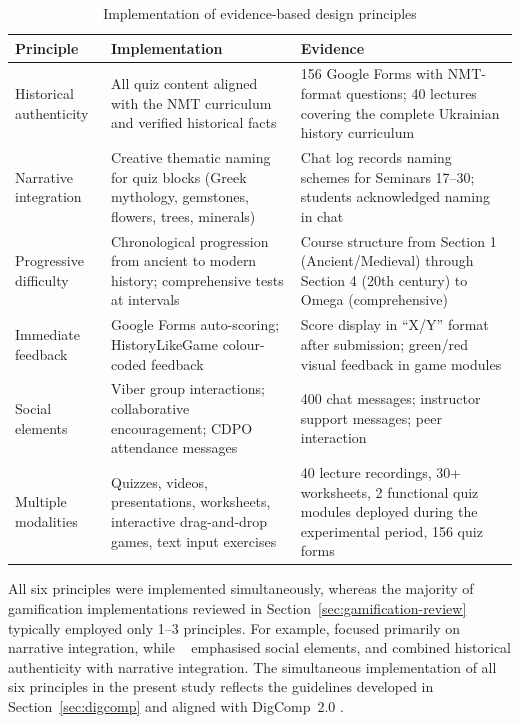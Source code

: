 \begin{table}[!h]
\centering
\caption{Implementation of evidence-based design principles}
\label{tab:design-principles-impl}
\small
\begin{tabular}{p{3cm}p{4.5cm}p{5cm}}
\hline
\textbf{Principle} & \textbf{Implementation} & \textbf{Evidence} \\
\hline
Historical authenticity & All quiz content aligned with the NMT curriculum and verified historical facts & 156 Google Forms with NMT-format questions; 40 lectures covering the complete Ukrainian history curriculum \\
\hline
Narrative integration & Creative thematic naming for quiz blocks (Greek mythology, gemstones, flowers, trees, minerals) & Chat log records naming schemes for Seminars 17--30; students acknowledged naming in chat \\
\hline
Progressive difficulty & Chronological progression from ancient to modern history; comprehensive tests at intervals & Course structure from Section 1 (Ancient/Medieval) through Section 4 (20th century) to Omega (comprehensive) \\
\hline
Immediate feedback & Google Forms auto-scoring; HistoryLikeGame colour-coded feedback & Score display in ``X/Y'' format after submission; green/red visual feedback in game modules \\
\hline
Social elements & Viber group interactions; collaborative encouragement; CDPO attendance messages & 400 chat messages; instructor support messages; peer interaction \\
\hline
Multiple modalities & Quizzes, videos, presentations, worksheets, interactive drag-and-drop games, text input exercises & 40 lecture recordings, 30+ worksheets, 2 functional quiz modules deployed during the experimental period, 156 quiz forms \\
\hline
\end{tabular}
\end{table}

All six principles were implemented simultaneously, whereas the majority of gamification implementations reviewed in Section~\ref{sec:gamification-review} \cite{KorniienkoSemerikov2024} typically employed only 1--3 principles. For example, \cite{1Barbatsis201159} focused primarily on narrative integration, while \citeauthor{16Chen201447}~\cite{16Chen201447} emphasised social elements, and \cite{55Squire2004} combined historical authenticity with narrative integration. The simultaneous implementation of all six principles in the present study reflects the guidelines developed in Section~\ref{sec:digcomp} \cite{Titova2025cte} and aligned with DigComp~2.0 \cite{Vuorikari2016}.

